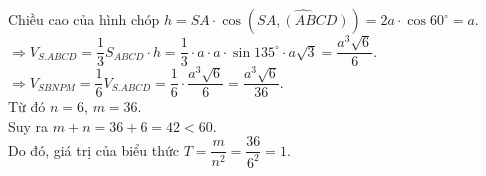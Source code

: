 \begin{ex}
{Chiều cao của hình chóp $h = SA \cdot \cos (\widehat{SA, (ABCD)}) = 2a \cdot \cos 60^\circ = a$.\\
$\Rightarrow V_{S.ABCD} = \dfrac{1}{3} S_{ABCD} \cdot h = \dfrac{1}{3} \cdot a \cdot a \cdot \sin 135^\circ \cdot a\sqrt{3} = \dfrac{a^3\sqrt{6}}{6}$.\\
$\Rightarrow V_{SBNPM} = \dfrac{1}{6} V_{S.ABCD} = \dfrac{1}{6} \cdot \dfrac{a^3\sqrt{6}}{6} = \dfrac{a^3\sqrt{6}}{36}$.\\
Từ đó $n=6$, $m=36$.\\
Suy ra $m+n = 36+6 = 42 < 60$.\\
Do đó, giá trị của biểu thức $T = \dfrac{m}{n^2} = \dfrac{36}{6^2} = 1$.
}
\end{ex}